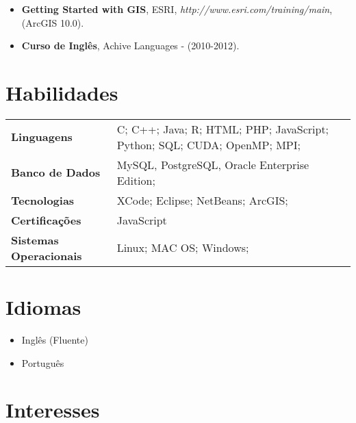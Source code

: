 \documentclass[a4paper, oneside, final]{scrartcl} %
\begin{document}
\begin{center}
\begin{itemize}
\item \textbf{Getting Started with GIS}, ESRI, \textit{http://www.esri.com/training/main}, (ArcGIS 10.0).

\item \textbf{Curso de Inglês}, Achive Languages - (2010-2012).

\end{itemize}


\section{Habilidades}

\begin{tabular}{ @{} >{\bfseries}l p{9cm} l  }
Linguagens & C; C++; Java; R; HTML; PHP; JavaScript; Python; SQL; CUDA; OpenMP; MPI; \\
Banco de Dados & MySQL, PostgreSQL, Oracle Enterprise Edition; \\
Tecnologias & XCode; Eclipse; NetBeans; ArcGIS;\\
Certificações & JavaScript\\
Sistemas Operacionais & Linux; MAC OS; Windows;
\end{tabular}


\section{Idiomas}

\begin{itemize} \itemsep1pt \parskip0pt 
  \item Inglês (Fluente)
  \item Português 
\end{itemize}


\section{Interesses}


\end{center}
\end{document}
